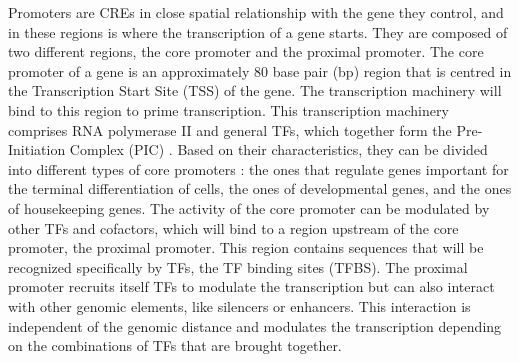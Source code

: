 Promoters are CREs in close spatial relationship with the gene they control, and in these regions is where the transcription of a gene starts. They are composed of two different regions, the core promoter and the proximal promoter. The core promoter of a gene is an approximately 80 base pair (bp) region that is centred in the Transcription Start Site (TSS) of the gene. The transcription machinery will bind to this region to prime transcription. This transcription machinery comprises RNA polymerase II and general TFs, which together form the Pre-Initiation Complex (PIC) \parencite{haberle_eukaryotic_2018}. Based on their characteristics, they can be divided into different types of core promoters \parencite{haberle_eukaryotic_2018}: the ones that regulate genes important for the terminal differentiation of cells, the ones of developmental genes, and the ones of housekeeping genes. The activity of the core promoter can be modulated by other TFs and cofactors, which will bind to a region upstream of the core promoter, the proximal promoter. This region contains sequences that will be recognized specifically by TFs, the TF binding sites (TFBS). The proximal promoter recruits itself TFs to modulate the transcription but can also interact with other genomic elements, like silencers or enhancers. This interaction is independent of the genomic distance and modulates the transcription depending on the combinations of TFs that are brought together. 


